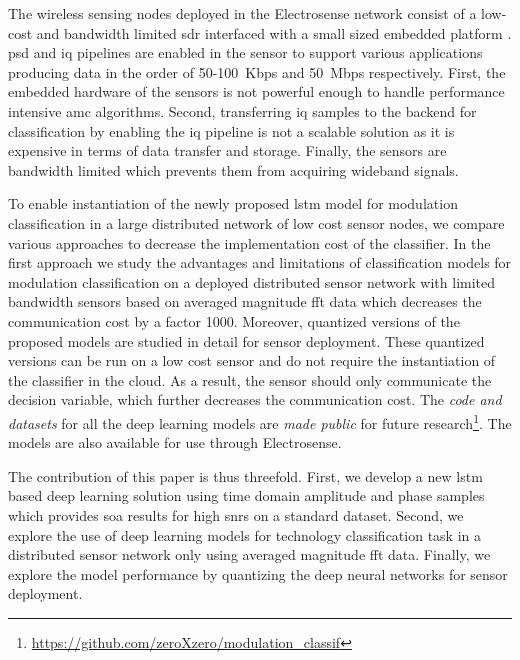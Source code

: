 The wireless sensing nodes deployed in the Electrosense network consist of a low-cost and bandwidth limited \ac{sdr} interfaced with a small sized embedded platform \cite{electrosense}. \ac{psd} and \ac{iq} pipelines are enabled in the sensor to support various applications producing data in the order of 50-100~Kbps and 50~Mbps respectively. First, the embedded hardware of the sensors is not powerful enough to handle performance intensive \ac{amc} algorithms. Second, transferring \ac{iq} samples to the backend for classification by enabling the \ac{iq} pipeline is not a scalable solution as it is expensive in terms of data transfer and storage. Finally, the sensors are bandwidth limited which prevents them from acquiring wideband signals.

To enable instantiation of the newly proposed \ac{lstm} model for modulation classification in a large distributed network of low cost sensor nodes, we compare various approaches to decrease the implementation cost of the classifier. In the first approach we study the advantages and limitations of classification models for modulation classification on a deployed distributed sensor network with limited bandwidth sensors based on averaged magnitude \ac{fft} data which decreases the communication cost by a factor 1000. Moreover, quantized versions of the proposed models are studied in detail for sensor deployment. These quantized versions can be run on a low cost sensor and do not require the instantiation of the classifier in the cloud. As a result, the sensor should only communicate the decision variable, which further decreases the communication cost. %
The \emph{code and datasets} for all the deep learning models are \emph{made public} for future research\footnote{\label{noterepo}\url{https://github.com/zeroXzero/modulation_classif}}. The models are also available for use through Electrosense. %

The contribution of this paper is thus threefold. First, we develop a new \ac{lstm} based deep learning solution using time domain amplitude and phase samples which provides \ac{soa} results for high \ac{snr}s on a standard dataset. Second, we explore the use of deep learning models for technology classification task in a distributed sensor network only using averaged magnitude \ac{fft} data. %
Finally, we explore the model performance by quantizing the deep neural networks for sensor deployment.

